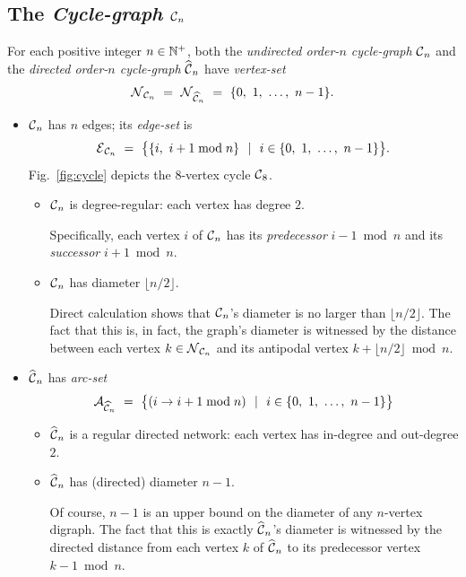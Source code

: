 \subsection{The {\it Cycle-graph} $\mbox{$\cal C$}_n$}
\label{sec:cycle}

   
 

For each positive integer $n \in \mathbb{N}^+$, both the {\it undirected order-$n$ cycle-graph} $\mbox{$\cal C$}_n$ and the {\it directed order-$n$ cycle-graph} $\widehat{\mbox{$\cal C$}}_n$  have {\it vertex-set}
\[ \n_{{\cal C}_n} \ = \ \n_{\widehat{{\cal C}}_n} \ = \ \{ 0, \ 1, \ \ldots, \ n-1\}. \]
\begin{itemize}
\item
$\mbox{$\cal C$}_n$ has $n$ edges; its {\it edge-set} is
\[ \mbox{$\cal E$}_{{\cal C}_n} \ = \ \big\{ \{i, \ i+1 \bmod n\} \ \ | \ \ i \in \{0, \ 1, \ \ldots, \ n-1\} \big\}.  \]
Fig.~\ref{fig:cycle} depicts the $8$-vertex cycle $\mbox{$\cal C$}_8$.
  \begin{itemize}
  \item
$\mbox{$\cal C$}_n$ is degree-regular: each vertex has degree $2$.

\smallskip

Specifically, each vertex $i$ of $\mbox{$\cal C$}_n$ has its {\it predecessor} $i-1 \bmod n$ and its {\it successor} $i+1 \bmod n$.

  \medskip\item 
$\mbox{$\cal C$}_n$ has diameter $\lfloor n/2 \rfloor$.

\smallskip

Direct calculation shows that $\mbox{$\cal C$}_n$'s diameter is no larger than $\lfloor n/2 \rfloor$.  The fact that this is, in fact, the graph's diameter is witnessed by the distance between each vertex $k \in \mbox{$\cal N$}_{{\cal C}_n}$ and its antipodal vertex $k + \lfloor n/2 \rfloor \bmod n$.
  \end{itemize}

\medskip\item
$\widehat{\mbox{$\cal C$}}_n$ has {\it arc-set}
\[ \a_{\widehat{{\cal C}}_n} \ = \ 
\big\{ (i \rightarrow i+1 \bmod n) \ \ | \ \ i \in \{0, \ 1, \ \ldots, \ n-1\} \big\}
\]
  \begin{itemize}
  \item 
$\widehat{\mbox{$\cal C$}}_n$ is a regular directed network: each vertex has in-degree and out-degree $2$.
  \medskip\item
$\widehat{\mbox{$\cal C$}}_n$ has (directed) diameter $n-1$.

\smallskip

Of course, $n-1$ is an upper bound on the diameter of any $n$-vertex digraph.  The fact that this is exactly $\widehat{\mbox{$\cal C$}}_n$'s diameter is witnessed by the directed distance from each vertex $k$ of $\widehat{\mbox{$\cal C$}}_n$ to its predecessor vertex $k-1 \bmod n$.
  \end{itemize}
\end{itemize}

